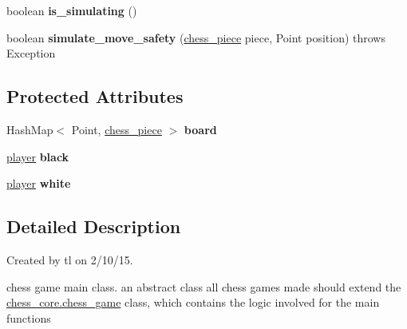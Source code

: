 \begin{DoxyCompactItemize}
\item 
\hypertarget{classchess__core_1_1chess__game_adfded27abed79ceced263ce726c48a13}{}boolean {\bfseries is\+\_\+simulating} ()\label{classchess__core_1_1chess__game_adfded27abed79ceced263ce726c48a13}

\item 
\hypertarget{classchess__core_1_1chess__game_a2625d75d88e1ad39dec7d34f713d1c01}{}boolean {\bfseries simulate\+\_\+move\+\_\+safety} (\hyperlink{classchess__core_1_1chess__piece}{chess\+\_\+piece} piece, Point position)  throws Exception \label{classchess__core_1_1chess__game_a2625d75d88e1ad39dec7d34f713d1c01}

\end{DoxyCompactItemize}
\subsection*{Protected Attributes}
\begin{DoxyCompactItemize}
\item 
\hypertarget{classchess__core_1_1chess__game_ac61db7251fc43f61985873492b6aede9}{}Hash\+Map$<$ Point, \hyperlink{classchess__core_1_1chess__piece}{chess\+\_\+piece} $>$ {\bfseries board}\label{classchess__core_1_1chess__game_ac61db7251fc43f61985873492b6aede9}

\item 
\hypertarget{classchess__core_1_1chess__game_a8bd15d77a95a3e8aa05895925390b321}{}\hyperlink{classchess__core_1_1chess__game_1_1player}{player} {\bfseries black}\label{classchess__core_1_1chess__game_a8bd15d77a95a3e8aa05895925390b321}

\item 
\hypertarget{classchess__core_1_1chess__game_a8bfcc0cfb084ed368c9fcc667969e766}{}\hyperlink{classchess__core_1_1chess__game_1_1player}{player} {\bfseries white}\label{classchess__core_1_1chess__game_a8bfcc0cfb084ed368c9fcc667969e766}

\end{DoxyCompactItemize}


\subsection{Detailed Description}
Created by tl on 2/10/15.

chess game main class. an abstract class all chess games made should extend the \hyperlink{classchess__core_1_1chess__game}{chess\+\_\+core.\+chess\+\_\+game} class, which contains the logic involved for the main functions

